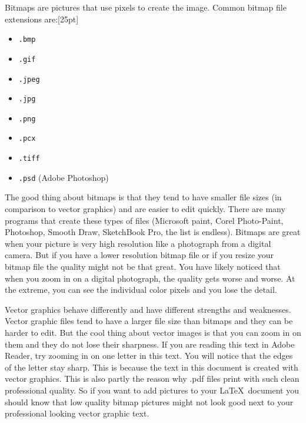 \documentclass{article}
\begin{document}
Bitmaps are pictures that use pixels to create the image.  Common bitmap file extensions are:[25pt]
\setlength{\columnseprule}{0pt}
\begin{multicols}{2}
\begin{itemize}
\renewcommand{\labelitemi}{$\triangleright$}
\item \texttt{.bmp}
\item \texttt{.gif}
\item \texttt{.jpeg}
\item \texttt{.jpg}
\item \texttt{.png}
\item \texttt{.pcx}
\item \texttt{.tiff}
\item \texttt{.psd} (Adobe Photoshop)
\end{itemize} 
\end{multicols}
The good thing about bitmaps is that they tend to have smaller file sizes (in comparison to vector graphics) and are easier to edit quickly.  There are many programs that create these types of files (Microsoft paint, Corel Photo-Paint, Photoshop, Smooth Draw, SketchBook Pro, the list is endless).  Bitmaps are great when your picture is very high resolution like a photograph from a digital camera.  But if you have a lower resolution bitmap file or if you resize your bitmap file the quality might not be that great.  You have likely noticed that when you zoom in on a digital photograph, the quality gets worse and worse.  At the extreme, you can see the individual color pixels and you lose the detail. 

Vector graphics behave differently and have different strengths and weaknesses. Vector graphic files tend to have a larger file size than bitmaps and they can be harder to edit.  But the cool thing about vector images is that you can zoom in on them and they do not lose their sharpness.  If you are reading this text in Adobe Reader, try zooming in on one letter in this text.  You will notice that the edges of the letter stay sharp.  This is because the text in this document is created with vector graphics.  This is also partly the reason why .pdf files print with such clean professional quality.  So if you want to add pictures to your \LaTeX\ document you should know that low quality bitmap pictures might not look good next to your professional looking vector graphic text.  
\end{document}
